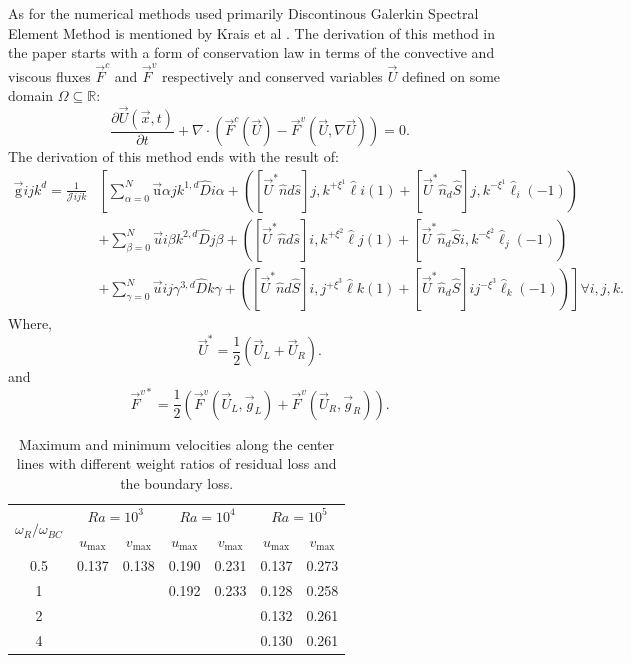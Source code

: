 \documentclass{article}
\begin{document}
As for the numerical methods used primarily Discontinous Galerkin Spectral Element Method is mentioned by Krais et al \cite{hellur}. The derivation of this method in the paper starts with a form of conservation law in terms of the convective and viscous fluxes $\vec{F}^c$ and $\vec{F}^v$ respectively and conserved variables $\vec{U}$ defined on some domain $\Omega \subseteq \mathbb{R}$:
\begin{equation}
     \frac{\partial \vec{U}(\vec{x}, t)}{\partial t}+\nabla \cdot\left(\vec{F}^c(\vec{U})-\vec{F}^v(\vec{U}, \nabla \vec{U})\right)=0.
\end{equation}
The derivation of this method ends with the result of:
\begin{align}
\overrightarrow{\mathrm{g}}{i j k}^d=\frac{1}{\mathcal{J}{i j k}} & {\left[\sum_{\alpha=0}^N \overrightarrow{\mathrm{u}}{\alpha j k}^{1, d} \hat{D}{i \alpha}+\left(\left[\vec{U}^* \hat{n}d \hat{s}\right]{j, k}^{+\xi^1} \hat{\ell}i(1)+\left[\vec{U}^* \hat{n}_d \hat{S}\right]{j, k}^{-\xi^1} \hat{\ell}_i(-1)\right)\right.} \\
& +\sum_{\beta=0}^N \vec{u}{i \beta k}^{2, d} \hat{D}{j \beta}+\left(\left[\vec{U}^* \hat{n}d \hat{s}\right]{i, k}^{+\xi^2} \hat{\ell}j(1)+\left[\vec{U}^* \hat{n}_d \hat{S}{i, k}^{-\xi^2} \hat{\ell}_j(-1)\right)\right. \\
& \left.+\sum_{\gamma=0}^N \vec{u}{i j \gamma}^{3, d} \hat{D}{k \gamma}+\left(\left[\vec{U}^* \hat{n}d \hat{S}\right]{i, j}^{+\xi^3} \hat{\ell}k(1)+\left[\vec{U}^* \hat{n}_d \hat{S}\right]{i j}^{-\xi^3} \hat{\ell}_k(-1)\right)\right] \forall i, j, k .
\end{align}
Where,
\begin{equation}
    \vec{U}^*=\frac{1}{2}\left(\vec{U}_L+\vec{U}_R\right).
\end{equation}
and
\begin{equation}
    \vec{F}^{v *}=\frac{1}{2}\left(\vec{F}^v\left(\vec{U}_L, \vec{g}_L\right)+\vec{F}^v\left(\vec{U}_R, \vec{g}_R\right)\right).
\end{equation}
\begin{table}[H]
\begin{center}
    
\caption{Maximum and minimum velocities along the center lines with different weight ratios of
residual loss and the boundary loss.}
\label{table:1}
\begin{tabular}{ccccccc}
\hline 
\hline 
\multirow{2}{*}{$\omega_R / \omega_{B C}$} 
& \multicolumn{2}{c}{$R a=10^3$} 
& \multicolumn{2}{c}{$R a=10^4$} 
& \multicolumn{2}{c}{$R a=10^5$} \\
\cline { 2 - 7 } 
& $u_{\max }$ 
& $v_{\max }$ 
& $u_{\max }$ 
& $v_{\max }$ 
& $u_{\max }$ 
& $v_{\max }$ \\
\hline 
\hline 0.5 & 0.137 & 0.138 & 0.190 & 0.231 & 0.137 & 0.273 \\
1 & & & 0.192 & 0.233 & 0.128 & 0.258 \\
2 & & & & & 0.132 & 0.261 \\
4 & & & & & 0.130 & 0.261 \\
\hline 
\hline
\end{tabular}
\end{center}
\end{table}
\printbibliography
\end{document}
